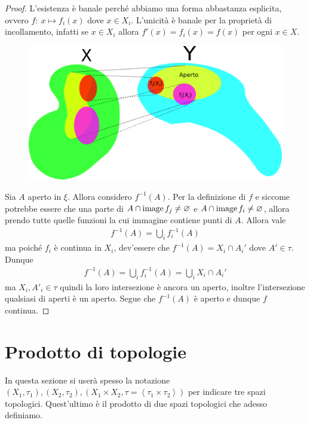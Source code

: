 \begin{proof}
	L'esistenza è banale perché abbiamo una forma abbastanza esplicita, ovvero $f \colon\ x \mapsto f_i(x)$ dove $x \in X_i$. L'unicità è banale per la proprietà di incollamento, infatti se $x \in X_i$ allora $f'(x) = f_i(x) = f(x)$ per ogni $x \in X$.
	
	\begin{figure}[h!]
		\centering
		\includegraphics[width=0.6\linewidth]{images/topologia_generale/Coomology_exercises_figure}
		\caption{}
		\label{fig:coomologyexercisesfigure}
	\end{figure}

	Sia $A$ aperto in $\xi$. Allora considero $f^{-1}(A)$. Per la definizione di $f$ e siccome potrebbe essere che una parte di $A \cap \operatorname{image}{f_j} \neq \varnothing$ e $A \cap \operatorname{image}{f_i} \neq \varnothing$, allora prendo tutte quelle funzioni la cui immagine contiene punti di $A$. Allora vale 
	\begin{equation}
	\begin{aligned}
		f^{-1}(A) = \bigcup_{i} f_i^{-1}(A) 
	\end{aligned}
	\end{equation}
	ma poiché $f_i$ è continua in $X_i$, dev'essere che $f^{-1}(A) = X_i \cap A_i'$ dove $A' \in \tau$. Dunque 
	\begin{equation}
	\begin{aligned}
		f^{-1}(A) = \bigcup_{i} f_i^{-1}(A) = \bigcup_{i} X_i \cap A_i' 
	\end{aligned}
	\end{equation}
	ma $X_i, A'_i \in \tau$ quindi la loro intersezione è ancora un aperto, inoltre l'intersezione qualsiasi di aperti è un aperto. Segue che $f^{-1}(A)$ è aperto e dunque $f$ continua.
\end{proof}


\section{Prodotto di topologie}

In questa sezione si userà spesso la notazione $(X_1, \tau_1), (X_2, \tau_2), (X_1 \times X_2, \tau = \left\langle\tau_1 \times \tau_2 \right\rangle)$ per indicare tre spazi topologici. Quest'ultimo è il prodotto di due spazi topologici che adesso definiamo.

